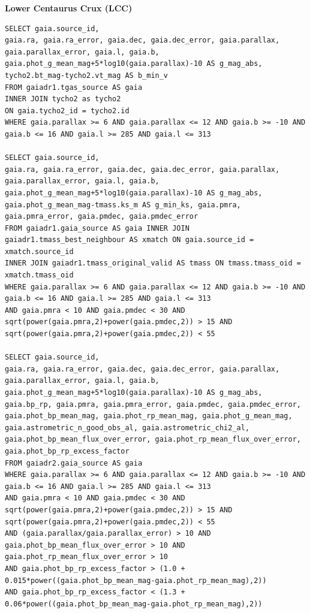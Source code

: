 \textbf{Lower Centaurus Crux (LCC)}
\begin{lstlisting}[frame = single]
SELECT gaia.source_id, 
gaia.ra, gaia.ra_error, gaia.dec, gaia.dec_error, gaia.parallax, gaia.parallax_error, gaia.l, gaia.b,
gaia.phot_g_mean_mag+5*log10(gaia.parallax)-10 AS g_mag_abs,
tycho2.bt_mag-tycho2.vt_mag AS b_min_v
FROM gaiadr1.tgas_source AS gaia
INNER JOIN tycho2 as tycho2
ON gaia.tycho2_id = tycho2.id
WHERE gaia.parallax >= 6 AND gaia.parallax <= 12 AND gaia.b >= -10 AND gaia.b <= 16 AND gaia.l >= 285 AND gaia.l <= 313

SELECT gaia.source_id, 
gaia.ra, gaia.ra_error, gaia.dec, gaia.dec_error, gaia.parallax, gaia.parallax_error, gaia.l, gaia.b, 
gaia.phot_g_mean_mag+5*log10(gaia.parallax)-10 AS g_mag_abs, 
gaia.phot_g_mean_mag-tmass.ks_m AS g_min_ks, gaia.pmra, gaia.pmra_error, gaia.pmdec, gaia.pmdec_error 
FROM gaiadr1.gaia_source AS gaia INNER JOIN gaiadr1.tmass_best_neighbour AS xmatch ON gaia.source_id = xmatch.source_id 
INNER JOIN gaiadr1.tmass_original_valid AS tmass ON tmass.tmass_oid = xmatch.tmass_oid 
WHERE gaia.parallax >= 6 AND gaia.parallax <= 12 AND gaia.b >= -10 AND gaia.b <= 16 AND gaia.l >= 285 AND gaia.l <= 313 
AND gaia.pmra < 10 AND gaia.pmdec < 30 AND sqrt(power(gaia.pmra,2)+power(gaia.pmdec,2)) > 15 AND sqrt(power(gaia.pmra,2)+power(gaia.pmdec,2)) < 55

SELECT gaia.source_id, 
gaia.ra, gaia.ra_error, gaia.dec, gaia.dec_error, gaia.parallax, gaia.parallax_error, gaia.l, gaia.b, 
gaia.phot_g_mean_mag+5*log10(gaia.parallax)-10 AS g_mag_abs, 
gaia.bp_rp, gaia.pmra, gaia.pmra_error, gaia.pmdec, gaia.pmdec_error, gaia.phot_bp_mean_mag, gaia.phot_rp_mean_mag, gaia.phot_g_mean_mag, 
gaia.astrometric_n_good_obs_al, gaia.astrometric_chi2_al, gaia.phot_bp_mean_flux_over_error, gaia.phot_rp_mean_flux_over_error, 
gaia.phot_bp_rp_excess_factor 
FROM gaiadr2.gaia_source AS gaia 
WHERE gaia.parallax >= 6 AND gaia.parallax <= 12 AND gaia.b >= -10 AND gaia.b <= 16 AND gaia.l >= 285 AND gaia.l <= 313 
AND gaia.pmra < 10 AND gaia.pmdec < 30 AND sqrt(power(gaia.pmra,2)+power(gaia.pmdec,2)) > 15 AND sqrt(power(gaia.pmra,2)+power(gaia.pmdec,2)) < 55 
AND (gaia.parallax/gaia.parallax_error) > 10 AND gaia.phot_bp_mean_flux_over_error > 10 AND gaia.phot_rp_mean_flux_over_error > 10 
AND gaia.phot_bp_rp_excess_factor > (1.0 + 0.015*power((gaia.phot_bp_mean_mag-gaia.phot_rp_mean_mag),2)) 
AND gaia.phot_bp_rp_excess_factor < (1.3 + 0.06*power((gaia.phot_bp_mean_mag-gaia.phot_rp_mean_mag),2))

\end{lstlisting}\vspace{5mm}

